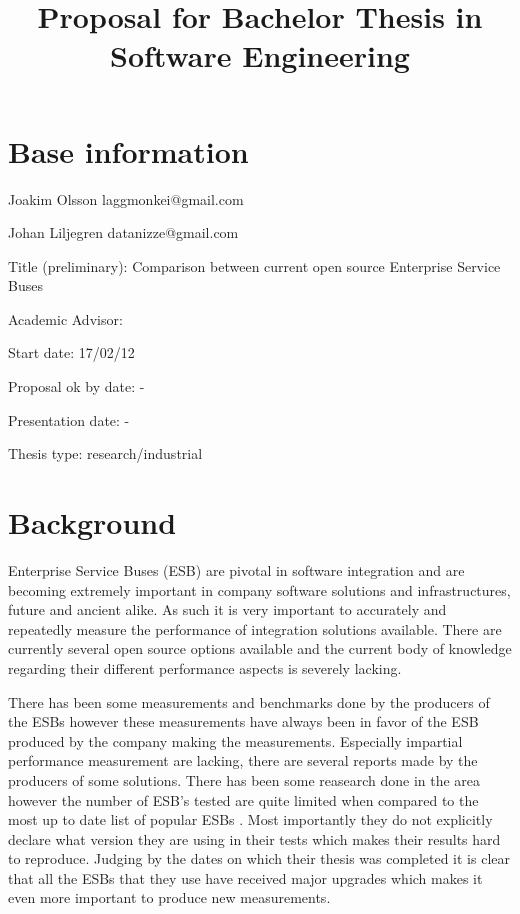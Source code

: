 \documentclass[10pt,a4paper]{proposal}
\title{Proposal for Bachelor Thesis in Software Engineering}
\begin{document}
\maketitle
\thispagestyle{fancy}


\section*{Base information}

Joakim Olsson laggmonkei@gmail.com

Johan Liljegren datanizze@gmail.com

Title (preliminary): Comparison between current open source Enterprise Service Buses

Academic Advisor:  

Start date: 17/02/12

Proposal ok by date: -

Presentation date: -


Thesis type: research\slash industrial


\section*{Background}


Enterprise Service Buses (ESB) \cite{falko07} are pivotal in software integration and are becoming extremely important in company software solutions and infrastructures, future and ancient alike. \cite{fenner03}
As such it is very important to accurately and repeatedly measure the performance of integration solutions available. 
There are currently several open source options available \cite{mehta11} and the current body of knowledge regarding their different performance aspects is severely lacking. 


There has been some measurements and benchmarks done by the producers of the ESBs however these measurements have always been in favor of the ESB produced by the company making the measurements. Especially impartial performance measurement are lacking, there are several reports made by the producers of some solutions. \cite{Perera07,mulevsjboss,mulevsglassfish,mulevsservicemix,mulesoft08} There has been some reasearch done in the area \cite{ESBthesis} however the number of ESB's tested are quite limited when compared to the most up to date list of popular ESBs \cite{mehta11}. Most importantly they do not explicitly declare what version they are using in their tests which makes their results hard to reproduce. Judging by the dates on which their thesis was completed it is clear that all the ESBs that they use have received major upgrades which makes it even more important to produce new measurements.
\end{document}

